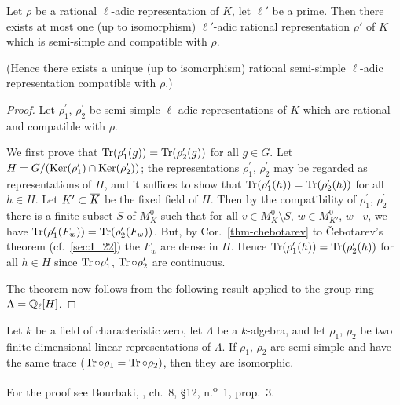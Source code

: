 \begin{thm}
Let $\rho$ be a rational $\ell$-adic representation of $K$, let $\ell'$ be a
prime.
Then there exists at most one (up to isomorphism) $\ell'$-adic rational
representation $\rho'$ of $K$ which is semi-simple and compatible with $\rho$.
\end{thm}
(Hence there exists a unique (up to isomorphism) rational semi-simple
$\ell$-adic representation compatible with $\rho$.)
\begin{proof}
Let $\rho_1^\prime$, $\rho_2^\prime$ be semi-simple $\ell$-adic representations
\dpage
of $K$ which are rational and compatible with $\rho$.

We first prove that $\operatorname{Tr}(\rho_1^\prime(g)) = \operatorname{Tr}(\rho_2^\prime(g))$ for all $g
\in G$.  Let $H = G/(\operatorname{Ker}(\rho_1^\prime) \cap \operatorname{Ker}(\rho_2^\prime))$; the
representations $\rho_1^\prime$, $\rho_2^\prime$ may be regarded as
representations of $H$, and it suffices to show that $\operatorname{Tr}(\rho_1^\prime(h)) =
\operatorname{Tr}(\rho_2^\prime(h))$ for all $h \in H$.
Let $K' \subset \overline{K}$ be the fixed field of $H$.
Then by the compatibility of $\rho_1^\prime$, $\rho_2^\prime$ there is a finite
subset $S$ of $M_K^0$ such that for all $v \in M_K^0 \setminus S$, $w \in
M_{K'}^0$, $w \mid v$, we have $\operatorname{Tr}(\rho_1^\prime(F_w)) =
\operatorname{Tr}(\rho_2^\prime(F_w))$.
But, by Cor.~\ref{thm-chebotarev} to \v{C}ebotarev's theorem (cf.\
\ref{sec:I_22}) the $F_w$ are dense in $H$. Hence $\operatorname{Tr}(\rho_1^\prime(h)) =
\operatorname{Tr}(\rho_2^\prime(h))$ for all $h \in H$ since $\operatorname{Tr} \circ \rho_1^\prime$, $\operatorname{Tr} \circ
\rho_2^\prime$ are continuous.

The theorem now follows from the following result applied to the group ring
$\Lambda = \mathbb{Q}_{\ell}[H]$.
\end{proof}

\begin{lem}
Let $k$ be a field of characteristic zero, let $\Lambda$ be a $k$-algebra, and
let $\rho_1$, $\rho_2$ be two finite-dimensional linear representations of
$\Lambda$.
If $\rho_1$, $\rho_2$ are semi-simple and have the same trace ($\operatorname{Tr} \circ \rho_1
= \operatorname{Tr} \circ \rho_2)$, then they are isomorphic.
\end{lem}

For the proof see Bourbaki, \cite{bourbaki:alg}, ch.~8, \S12,
n.\textsuperscript{o}~1, prop.~3.

